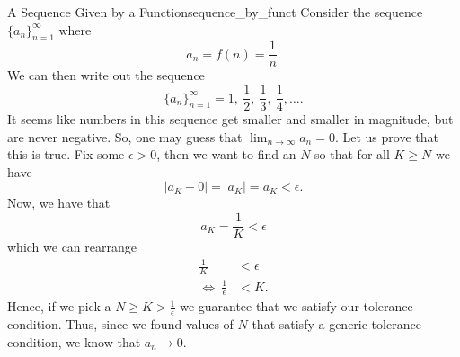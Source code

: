 \begin{ex}{A Sequence Given by a Function}{sequence_by_funct}
Consider the sequence $\{a_n\}_{n=1}^\infty$ where
\[
a_n = f(n) = \frac{1}{n}.
\]
We can then write out the sequence
\[
\{a_n\}_{n=1}^\infty = 1, ~\frac{1}{2}, ~\frac{1}{3}, ~ \frac{1}{4}, \dots.
\]
It seems like numbers in this sequence get smaller and smaller in magnitude, but are never negative.  So, one may guess that $\lim_{n\to \infty} a_n = 0$.  Let us prove that this is true.  Fix some $\epsilon >0$, then we want to find an $N$ so that for all $K\geq N$ we have
\[
|a_K - 0| = |a_K|=a_K<\epsilon.
\]
Now, we have that
\[
a_K=\frac{1}{K} < \epsilon
\]
which we can rearrange
\begin{align*}
    \frac{1}{K} & < \epsilon \\
    \iff~ \frac{1}{\epsilon} & < K.
\end{align*}
Hence, if we pick a $N\geq K>\frac{1}{\epsilon}$ we guarantee that we satisfy our tolerance condition. Thus, since we found values of $N$ that satisfy a generic tolerance condition, we know that $a_n \to 0$.


\end{ex}
